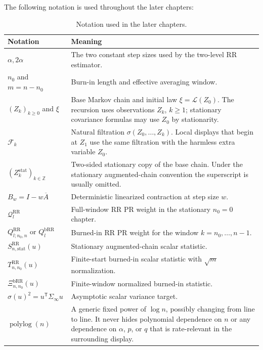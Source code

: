 The following notation is used throughout the later chapters:

\begin{table}[htbp]
\centering
\small
\caption{Notation used in the later chapters.}
\begin{tabular}{|p{}|p{}|}
\hline
\textbf{Notation} & \textbf{Meaning} \\
\hline
$\alpha,2\alpha$ & The two constant step sizes used by the two-level RR estimator. \\
\hline
$n_0$ and $m=n-n_0$ & Burn-in length and effective averaging window. \\
\hline
$(Z_k)_{k\ge0}$ and $\xi$ & Base Markov chain and initial law
$\xi=\mathcal{L}(Z_0)$. The recursion uses observations $Z_k$, $k\ge1$;
stationary covariance formulas may use $Z_0$ by stationarity. \\
\hline
$\mathcal{F}_k$ & Natural filtration $\sigma(Z_0,\ldots,Z_k)$. Local displays
that begin at $Z_1$ use the same filtration with the harmless extra variable
$Z_0$. \\
\hline
$(Z_k^{\mathrm{stat}})_{k\in\mathbb Z}$ & Two-sided stationary copy of the
base chain. Under the stationary augmented-chain convention the superscript is
usually omitted. \\
\hline
$B_w=I-w\overline A$ & Deterministic linearized contraction at step size $w$. \\
\hline
$\mathcal{Q}_l^{\mathrm{RR}}$ & Full-window RR PR weight in the stationary
$n_0=0$ chapter. \\
\hline
$Q_{l;n_0,n}^{\mathrm{RR}}$ or $Q_l^{\mathrm{bRR}}$ & Burned-in RR PR weight
for the window $k=n_0,\ldots,n-1$. \\
\hline
$S_{n,\mathrm{stat}}^{\mathrm{RR}}(u)$ & Stationary augmented-chain scalar statistic. \\
\hline
$T_{n,n_0}^{\mathrm{RR}}(u)$ & Finite-start burned-in scalar statistic with
$\sqrt m$ normalization. \\
\hline
$\Xi_{n,n_0}^{\mathrm{bRR}}(u)$ & Finite-window normalized burned-in statistic. \\
\hline
$\sigma(u)^2=u^{\mathsf T}\Sigma_\infty u$ & Asymptotic scalar variance target. \\
\hline
$\operatorname{polylog}(n)$ & A generic fixed power of $\log n$, possibly
changing from line to line. It never hides polynomial dependence on $n$ or any
dependence on $\alpha$, $p$, or $q$ that is rate-relevant in the surrounding
display. \\
\hline
\end{tabular}
\end{table}
